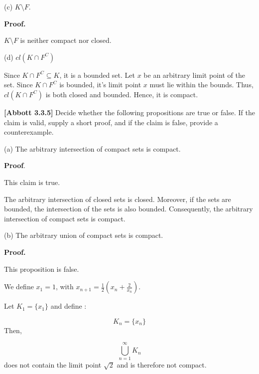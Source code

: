 \documentclass[10pt]{article}
\begin{document}
(c) $\displaystyle K\setminus F$.



\textbf{Proof.}



$\displaystyle K\setminus F$ is neither compact nor closed.



(d) $\displaystyle cl\left( K\cap F^{C}\right)$



Since $\displaystyle K\cap F^{C} \subseteq K$, it is a bounded set. Let $\displaystyle x$ be an arbitrary limit point of the set. Since $\displaystyle K\cap F^{C}$ is bounded, it's limit point $\displaystyle x$ must lie within the bounds. Thus, $\displaystyle cl\left( K\cap F^{C}\right)$ is both closed and bounded. Hence, it is compact. 



\textbf{[Abbott 3.3.5] }Decide whether the following propositions are true or false. If the claim is valid, supply a short proof, and if the claim is false, provide a counterexample.



(a) The arbitrary intersection of compact sets is compact.



\textbf{Proof}.

This claim is true.



The arbitrary intersection of closed sets is closed. Moreover, if the sets are bounded, the intersection of the sets is also bounded. Consequently, the arbitrary intersection of compact sets is compact.



(b) The arbitrary union of compact sets is compact.



\textbf{Proof.}



This proposition is false.



We define $\displaystyle x_{1} =1$, with $\displaystyle x_{n+1} =\frac{1}{2}\left( x_{n} +\frac{2}{x_{n}}\right)$.



Let $\displaystyle K_{1} =\{x_{1}\}$ and define :


\begin{equation*}
K_{n} =\{x_{n}\}
\end{equation*}
Then,


\begin{equation*}
\bigcup _{n=1}^{\infty } K_{n}
\end{equation*}
does not contain the limit point $\displaystyle \sqrt{2}$ and is therefore not compact.
\end{document}
